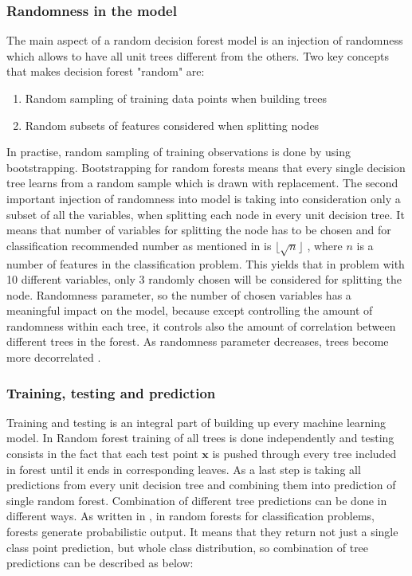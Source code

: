 \subsubsection{Randomness in the model}
The main aspect of a random decision forest model is an injection of randomness which allows to have all unit trees different from the others. Two key concepts that makes decision forest "random" are:
\begin{enumerate}
	\item Random sampling of training data points when building trees
	\item Random subsets of features considered when splitting nodes
\end{enumerate}
In practise, random sampling of training observations is done by using bootstrapping. 
Bootstrapping for random forests means that every single decision tree learns from a random sample which is drawn with replacement. 
The second important injection of randomness into model is taking into consideration only a subset of all the variables, 
when splitting each node in every unit decision tree. It means that number of variables for splitting the node has to be chosen 
and for classification recommended number as mentioned in\cite{friedman2001elements} is $\lfloor{\sqrt{n}} \rfloor$ , 
where $n$ is a number of features in the classification problem. This yields that in problem with 10 different variables, 
only 3 randomly chosen will be considered for splitting the node. Randomness parameter, 
so the number of chosen variables has a meaningful impact on the model, 
because except controlling the amount of randomness within each tree, 
it controls also the amount of correlation between different trees in the forest. 
As randomness parameter decreases, trees become more decorrelated \cite{criminisi2012decision}.

\subsubsection {Training, testing and prediction}
Training and testing is an integral part of building up every machine learning model.
In Random forest training of all trees is done independently and testing consists in the fact that each test point $\textbf{x}$ is pushed 
through every tree included in forest until it ends in corresponding leaves. As a last step is taking all predictions from 
every unit decision tree and combining them into prediction of single random forest. Combination of different tree predictions 
can be done in different ways. As written in \cite{CGV-035}, in random forests for classification problems, forests generate probabilistic output. 
It means that they return not just a single class point prediction, but whole class distribution, 
so combination of tree predictions can be described as below:

